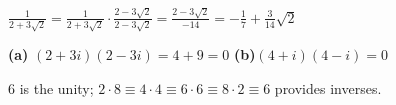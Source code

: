 \documentclass[12pt]{book}
\theoremstyle{definition}
\providecommand\phantomsection{}
\begin{document}
\begin{oddenumerate}
	\item $ \frac{1}{2+3\sqrt{2}}= \frac{1}{2+3\sqrt{2}}\cdot\frac{2-3\sqrt{2}}{2-3\sqrt{2}}=\frac{2-3\sqrt{2}}{-14} =-\frac{1}{7}+\frac{3}{14}\sqrt{2}$
	
	\item \textbf{(a)} $ (2+3i)(2-3i)=4+9=0 $ \textbf{(b)}$ (4+i)(4-i)=0 $
	
	\item 6 is the unity; $ 2\cdot 8\equiv 4\cdot4 \equiv 6\cdot6\equiv 8\cdot 2 \equiv 6 $ provides inverses. 
	
	
	
	
\end{oddenumerate}
\backmatter

\printindex



\clearpage


\clearpage
\pagestyle{empty}

\cleardoublepage


\cleardoublepage
\phantomsection{}


\cleardoublepage
\end{document}
